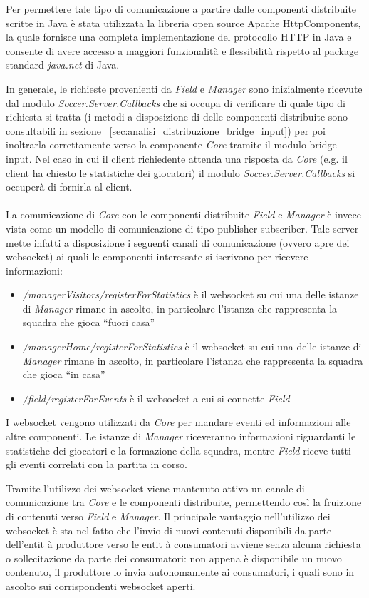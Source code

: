 Per permettere tale tipo di comunicazione a partire dalle componenti distribuite scritte in Java \`{e} stata utilizzata la libreria open source Apache HttpComponents, la quale fornisce una completa implementazione del protocollo HTTP in Java e consente di avere accesso a maggiori funzionalit\`{a} e flessibilit\`{a} rispetto al package standard \emph{java.net} di Java.

In generale, le richieste provenienti da \emph{Field} e \emph{Manager} sono inizialmente ricevute dal modulo \emph{Soccer.Server.Callbacks} che si occupa di verificare di quale tipo di richiesta si tratta (i metodi a disposizione di delle componenti distribuite sono consultabili in sezione ~\ref{sec:analisi_distribuzione_bridge_input}) per poi inoltrarla correttamente verso la componente \emph{Core} tramite il modulo bridge input. Nel caso in cui il client richiedente attenda una risposta da \emph{Core} (e.g. il client ha chiesto le statistiche dei giocatori) il modulo \emph{Soccer.Server.Callbacks} si occuper\`{a} di fornirla al client.\\\\
La comunicazione di \emph{Core} con le componenti distribuite \emph{Field} e \emph{Manager} \`{e} invece vista come un modello di comunicazione di tipo publisher-subscriber. Tale server mette infatti a disposizione i seguenti canali di comunicazione (ovvero apre dei websocket) ai quali le componenti interessate si iscrivono per ricevere informazioni:
\begin{itemize}
\item \emph{/managerVisitors/registerForStatistics} \`{e} il websocket su cui una delle istanze di \emph{Manager} rimane in ascolto, in particolare l'istanza che rappresenta la squadra che gioca ``fuori casa''
\item \emph{/managerHome/registerForStatistics} \`{e} il websocket su cui una delle istanze di \emph{Manager} rimane in ascolto, in particolare l'istanza che rappresenta la squadra che gioca ``in casa''
\item \emph{/field/registerForEvents} \`{e} il websocket a cui si connette \emph{Field}
\end{itemize}
\noindent I websocket vengono utilizzati da \emph{Core} per mandare eventi ed informazioni alle altre componenti. Le istanze di \emph{Manager} riceveranno informazioni riguardanti le statistiche dei giocatori e la formazione della squadra, mentre \emph{Field} riceve tutti gli eventi correlati con la partita in corso. 

Tramite l'utilizzo dei websocket viene mantenuto attivo un canale di comunicazione tra \emph{Core} e le componenti distribuite, permettendo cos\`{i} la fruizione di contenuti verso \emph{Field} e \emph{Manager}. Il principale vantaggio nell'utilizzo dei websocket  \`{e} sta nel fatto che l'invio di nuovi contenuti disponibili da parte dell'entit \`{a} produttore verso le entit \`{a} consumatori avviene senza alcuna richiesta o sollecitazione da parte dei consumatori: non appena  \`{e}  disponibile un nuovo contenuto, il produttore lo invia autonomamente ai consumatori, i quali sono in ascolto sui corrispondenti websocket aperti.


